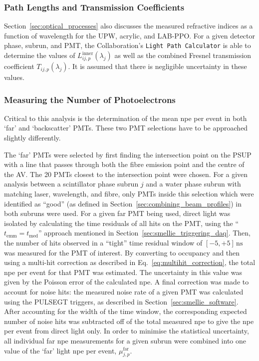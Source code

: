 \subsubsection{Path Lengths and Transmission Coefficients}
Section~\ref{sec:optical_processes} also discusses the measured refractive indices as a function of wavelength for the UPW, acrylic, and LAB-PPO. For a given detector phase, subrun, and PMT, the Collaboration's \texttt{Light Path Calculator} is able to determine the values of $L_{ij,p}^{\mathrm{inner}}(\lambda_{j})$ as well as the combined Fresnel transmission coefficient $T_{ij,p}(\lambda_{j})$. It is assumed that there is negligible uncertainty in these values.

\subsubsection{Measuring the Number of Photoelectrons}
Critical to this analysis is the determination of the mean npe per event in both `far' and `backscatter' PMTs. These two PMT selections have to be approached slightly differently.

The `far' PMTs were selected by first finding the intersection point on the PSUP with a line that passes through both the fibre emission point and the centre of the AV. The 20 PMTs closest to the intersection point were chosen. For a given analysis between a scintillator phase subrun $j$ and a water phase subrun with matching laser, wavelength, and fibre, only PMTs inside this selection which were identified as ``good'' (as defined in Section~\ref{sec:combining_beam_profiles}) in both subruns were used. For a given far PMT being used, direct light was isolated by calculating the time residuals of all hits on the PMT, using the ``$t_{\mathrm{emm}} = t_{\mathrm{med}}$'' approach mentioned in Section~\ref{sec:smellie_triggering_daq}. Then, the number of hits observed in a ``tight'' time residual window of $[-5,+5]\,\si{\ns}$ was measured for the PMT of interest. By converting to occupancy and then using a multi-hit correction as described in Eq.~\ref{eq:multihit_correction}, the total npe per event for that PMT was estimated. The uncertainty in this value was given by the Poisson error of the calculated npe. A final correction was made to account for noise hits: the measured noise rate of a given PMT was calculated using the PULSEGT triggers, as described in Section~\ref{sec:smellie_software}. After accounting for the width of the time window, the corresponding expected number of noise hits was subtracted off of the total measured npe to give the npe per event from direct light only.
In order to minimise the statistical uncertainty, all individual far npe measurements for a given subrun were combined into one value of the `far' light npe per event, $\mu_{j,p}^{\mathrm{far}}$.

